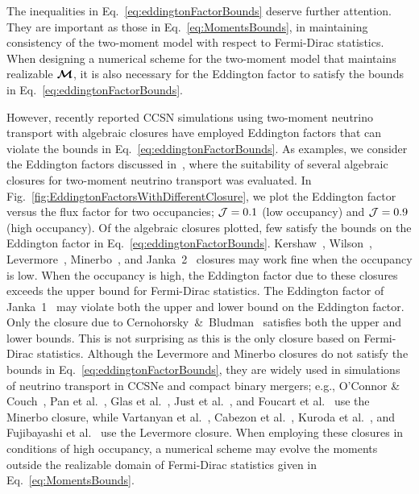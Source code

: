 The inequalities in Eq.~\eqref{eq:eddingtonFactorBounds} deserve further attention.  
They are important as those in Eq.~\eqref{eq:MomentsBounds}, in maintaining consistency of the two-moment model with respect to Fermi-Dirac statistics.  
When designing a numerical scheme for the two-moment model that maintains realizable $\boldsymbol{\mathcal{M}}$, it is also necessary for the Eddington factor to satisfy the bounds in Eq.~\eqref{eq:eddingtonFactorBounds}.  

However, recently reported CCSN simulations using two-moment neutrino transport with algebraic closures have employed Eddington factors that can violate the bounds in Eq.~\eqref{eq:eddingtonFactorBounds}.  
As examples, we consider the Eddington factors discussed in~\cite{murchikova_etal_2017}, where the suitability of several algebraic closures for two-moment neutrino transport was evaluated.  
In Fig.~\ref{fig:EddingtonFactorsWithDifferentClosure}, we plot the Eddington factor versus the flux factor for two occupancies; $\mathcal{J} = 0.1$ (low occupancy) and $\mathcal{J} = 0.9$ (high occupancy).  
Of the algebraic closures plotted, few satisfy the bounds on the Eddington factor in Eq.~\eqref{eq:eddingtonFactorBounds}.  
Kershaw~\cite{kershaw_1976}, Wilson~\cite{wilson_1975,leblancWilson_1970}, Levermore~\cite{levermore_1984}, Minerbo~\cite{minerbo_1978}, and Janka~2~\cite{janka_1992} closures may work fine when the occupancy is low.  
When the occupancy is high, the Eddington factor due to these closures exceeds the upper bound for Fermi-Dirac statistics.  
The Eddington factor of Janka~1~\cite{janka_1991} may violate both the upper and lower bound on the Eddington factor.  
Only the closure due to Cernohorsky~\&~Bludman~\cite{cernohorskyBludman_1994} satisfies both the upper and lower bounds.  
This is not surprising as this is the only closure based on Fermi-Dirac statistics.  
Although the Levermore and Minerbo closures do not satisfy the bounds in Eq.~\eqref{eq:eddingtonFactorBounds}, they are widely used in simulations of neutrino transport in CCSNe and compact binary mergers; e.g., O'Connor \& Couch~\cite{oConnorCouch_2018}, Pan et al.~\cite{pan_etal_2018}, Glas et al.~\cite{glas_etal_2018}, Just et al.~\cite{just_etal_2018}, and Foucart et al.~\cite{foucart_etal_2015} use the Minerbo closure, while Vartanyan et al.~\cite{vartanyan_etal_2018}, Cabezon et al.~\cite{cabezon_etal_2018}, Kuroda et al.~\cite{kuroda_etal_2016}, and Fujibayashi et al.~\cite{fujibayashi_etal_2017} use the Levermore closure.  
When employing these closures in conditions of high occupancy, a numerical scheme may evolve the moments outside the realizable domain of Fermi-Dirac statistics given in Eq.~\eqref{eq:MomentsBounds}.
